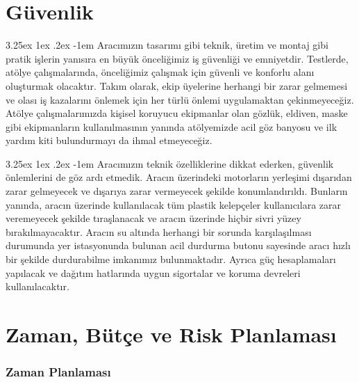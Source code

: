 \documentclass[12pt]{article}
\makeatletter
\renewcommand\paragraph{\@startsection{paragraph}{5}{\z@}%
  {3.25ex \@plus1ex \@minus.2ex}%
  {-1em}%
  {\normalfont\normalsize\bfseries}}
\makeatother
\begin{document}


\section{Güvenlik}


\paragraph{} Aracımızın tasarımı gibi teknik, üretim ve montaj gibi pratik işlerin yanısıra en büyük önceliğimiz iş güvenliği ve emniyetdir. Testlerde, atölye çalışmalarında, önceliğimiz çalışmak için güvenli ve konforlu alanı oluşturmak olacaktır. Takım olarak, ekip üyelerine herhangi bir zarar gelmemesi ve olası iş kazalarını önlemek için her türlü önlemi uygulamaktan çekinmeyeceğiz.
Atölye çalışmalarımızda kişisel koruyucu ekipmanlar olan gözlük, eldiven, maske gibi ekipmanların kullanılmasının yanında atölyemizde acil göz banyosu ve ilk yardım kiti bulundurmayı da ihmal etmeyeceğiz.

\paragraph{} Aracımızın teknik özelliklerine dikkat ederken, güvenlik önlemlerini de göz ardı etmedik. Aracın üzerindeki motorların yerleşimi dışarıdan zarar gelmeyecek ve dışarıya zarar vermeyecek şekilde konumlandırıldı. Bunların yanında, aracın üzerinde kullanılacak tüm plastik kelepçeler kullanıcılara zarar veremeyecek şekilde tıraşlanacak ve aracın üzerinde hiçbir sivri yüzey bırakılmayacaktır. Aracın su altında herhangi bir sorunda karşılaşılması durumunda yer istasyonunda bulunan acil durdurma butonu sayesinde aracı hızlı bir şekilde durdurabilme imkanımız bulunmaktadır. Ayrıca güç hesaplamaları yapılacak ve dağıtım hatlarında uygun sigortalar ve koruma devreleri kullanılacaktır.

\section{Zaman, Bütçe ve Risk Planlaması}
\subsubsection{Zaman Planlaması}
\end{document}
